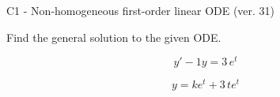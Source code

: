 \begin{exercise}
  \begin{exerciseTitle}C1 - Non-homogeneous first-order linear ODE (ver. 31)\end{exerciseTitle}
  \begin{exerciseStatement}
    
Find the general solution to the given ODE.

    
\[y'-1y= 3 \, e^{t}\]

  \end{exerciseStatement}
  \begin{exerciseAnswer}
    
\[y= k e^{t} + 3 \, t e^{t}\]

  \end{exerciseAnswer}
\end{exercise}